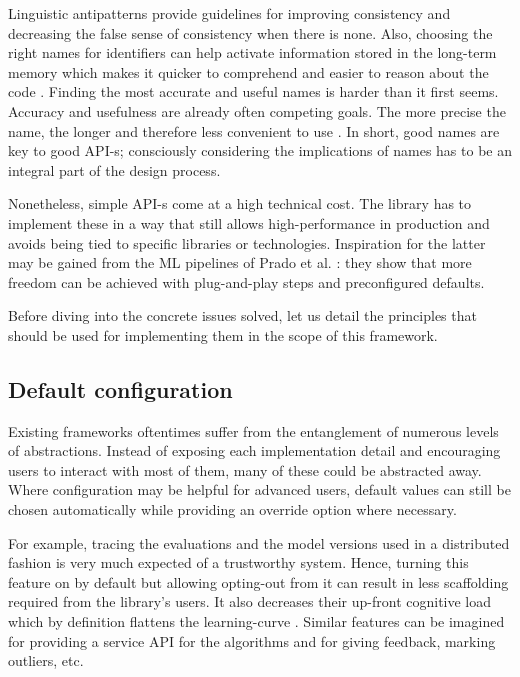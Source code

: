 Linguistic antipatterns provide guidelines for improving consistency and decreasing the false sense of consistency when there is none. Also, choosing the right names for identifiers can help activate information stored in the long-term memory which makes it quicker to comprehend and easier to reason about the code \cite{deissenboeck2006concise}. Finding the most accurate and useful names is harder than it first seems. Accuracy and usefulness are already often competing goals. The more precise the name, the longer and therefore less convenient to use \cite{butler2009relating}. In short, good names are key to good API-s; consciously considering the implications of names has to be an integral part of the design process.

Nonetheless, simple API-s come at a high technical cost. The library has to implement these in a way that still allows high-performance in production \cite{kleppmann2017designing} and avoids being tied to specific libraries or technologies. Inspiration for the latter may be gained from the ML pipelines of Prado et al. \cite{prado2020bonseyes}: they show that more freedom can be achieved with plug-and-play steps and preconfigured defaults. 

Before diving into the concrete issues solved, let us detail the principles that should be used for implementing them in the scope of this framework.

\subsection{Default configuration}

Existing frameworks oftentimes suffer from the entanglement of numerous levels of abstractions. Instead of exposing each implementation detail and encouraging users to interact with most of them, many of these could be abstracted away. Where configuration may be helpful for advanced users, default values can still be chosen automatically while providing an override option where necessary.

For example, tracing the evaluations and the model versions used in a distributed fashion is very much expected of a trustworthy system. Hence, turning this feature on by default but allowing opting-out from it can result in less scaffolding required from the library's users. It also decreases their up-front cognitive load which by definition flattens the learning-curve \cite{hermans2021programmer}. Similar features can be imagined for providing a service API for the algorithms and for giving feedback, marking outliers, etc.

